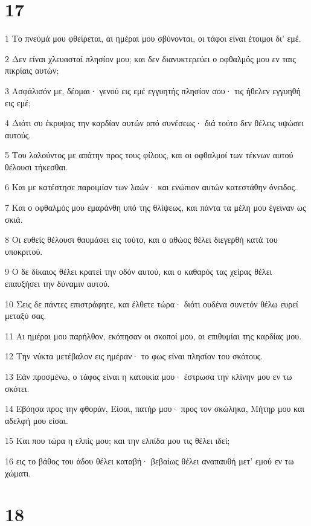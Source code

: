 \chapter{17}

\par 1 Το πνεύμά μου φθείρεται, αι ημέραι μου σβύνονται, οι τάφοι είναι έτοιμοι δι' εμέ.
\par 2 Δεν είναι χλευασταί πλησίον μου; και δεν διανυκτερεύει ο οφθαλμός μου εν ταις πικρίαις αυτών;
\par 3 Ασφάλισόν με, δέομαι· γενού εις εμέ εγγυητής πλησίον σου· τις ήθελεν εγγυηθή εις εμέ;
\par 4 Διότι συ έκρυψας την καρδίαν αυτών από συνέσεως· διά τούτο δεν θέλεις υψώσει αυτούς.
\par 5 Του λαλούντος με απάτην προς τους φίλους, και οι οφθαλμοί των τέκνων αυτού θέλουσι τήκεσθαι.
\par 6 Και με κατέστησε παροιμίαν των λαών· και ενώπιον αυτών κατεστάθην όνειδος.
\par 7 Και ο οφθαλμός μου εμαράνθη υπό της θλίψεως, και πάντα τα μέλη μου έγειναν ως σκιά.
\par 8 Οι ευθείς θέλουσι θαυμάσει εις τούτο, και ο αθώος θέλει διεγερθή κατά του υποκριτού.
\par 9 Ο δε δίκαιος θέλει κρατεί την οδόν αυτού, και ο καθαρός τας χείρας θέλει επαυξήσει την δύναμιν αυτού.
\par 10 Σεις δε πάντες επιστράφητε, και έλθετε τώρα· διότι ουδένα συνετόν θέλω ευρεί μεταξύ σας.
\par 11 Αι ημέραι μου παρήλθον, εκόπησαν οι σκοποί μου, αι επιθυμίαι της καρδίας μου.
\par 12 Την νύκτα μετέβαλον εις ημέραν· το φως είναι πλησίον του σκότους.
\par 13 Εάν προσμένω, ο τάφος είναι η κατοικία μου· έστρωσα την κλίνην μου εν τω σκότει.
\par 14 Εβόησα προς την φθοράν, Είσαι, πατήρ μου· προς τον σκώληκα, Μήτηρ μου και αδελφή μου είσαι.
\par 15 Και που τώρα η ελπίς μου; και την ελπίδα μου τις θέλει ιδεί;
\par 16 εις το βάθος του άδου θέλει καταβή· βεβαίως θέλει αναπαυθή μετ' εμού εν τω χώματι.

\chapter{18}

